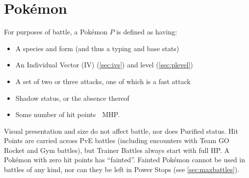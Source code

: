 \chapter{Pokémon}
\label{chap:pokemon}
For purposes of battle, a Pokémon $P$ is defined as having:
\begin{itemize}
\item A species and form (and thus a typing and base stats)
\item An Individual Vector (IV) (\autoref{sec:ivs}) and level (\autoref{sec:plevel})
\item A set of two or three attacks, one of which is a fast attack
\item Shadow status, or the absence thereof
\item Some number of hit points {\symbolfont󰥽} MHP.
\end{itemize}
Visual presentation and size do not affect battle, nor does Purified status.
Hit Points are carried across PvE battles (including encounters with
  Team GO Rocket and Gym battles), but Trainer Battles always start with full HP\@.
A Pokémon with zero hit points has ``fainted''.
Fainted Pokémon cannot be used in battles of any kind, nor can they be left in
 Power Stops (see \autoref{sec:maxbattles}).

